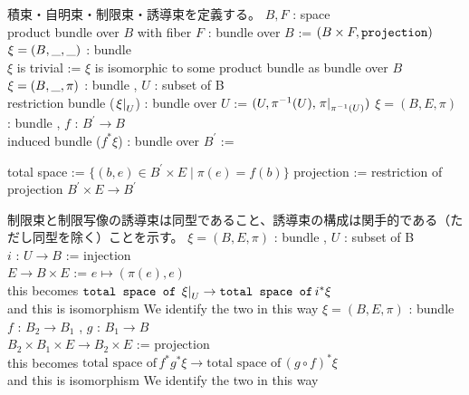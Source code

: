 \begin{Definition}
\itemnote
  積束・自明束・制限束・誘導束を定義する。
\itemdefi
  \For \(B , F\) : space \\
  \Define product bundle over \(B\) with fiber \(F\) : bundle over \(B\) := \((B \times F , \texttt{projection})\)
\itemdefi
  \For \(\xi = (B , \_ , \_)\) : bundle \\
  \Define \(\xi\) is trivial := \(\xi\) is isomorphic to some product bundle as bundle over \(B\)
\itemdefi
  \For \(\xi = (B , \_ , \pi)\) : bundle , \(U\) : subset of B \\
  \Define restriction bundle (\(\left. {\xi} \right| _{U}\)) : bundle over \(U\) := \((U , \pi^{-1}(U) , \left. {\pi} \right| _{\pi^{-1}(U)})\)
\itemdefi
  \For \(\xi = (B , E , \pi)\) : bundle , \(f\) : \(B^{\prime} \to B\) \\
  \Define induced bundle (\(f^*\xi\)) : bundle over \(B^{\prime}\) :=
  \begin{itemize}
    \itemenum total space := \(\{(b , e) \in B^{\prime} \times E \mid \pi(e) = f(b)\}\)
    \itemenum projection := restriction of projection \(B^{\prime} \times E \to B^{\prime}\)
  \end{itemize}
\end{Definition}

\begin{Theorem}
\itemnote
  制限束と制限写像の誘導束は同型であること、誘導束の構成は関手的である（ただし同型を除く）ことを示す。
\itemprop
  \For \(\xi = (B , E ,\pi)\) : bundle , \(U\) : subset of B \\
  \Let \(i\) : \(U \to B\) := injection \\
  \Let \(E \to B \times E\) := \(e \mapsto (\pi(e) , e)\) \\
  \Then this becomes \(\texttt{total space of} \, \left. {\xi} \right| _{U} \to \texttt{total space of} \, i^*\xi\) \\
  and this is isomorphism
\itemnote
  We identify the two in this way
\itemprop
  \For \(\xi = (B , E , \pi)\) : bundle \\
  \For \(f\) : \(B_2 \to B_1\) , \(g\) : \(B_1 \to B\) \\
  \Let \(B_2 \times B_1 \times E \to B_2 \times E\) := projection \\
  \Then this becomes \(\text{total space of} \, f^*g^* \xi \to \text{total space of} \, (g \circ f)^* \xi\) \\
  and this is isomorphism
\itemnote
  We identify the two in this way 
\end{Theorem}

